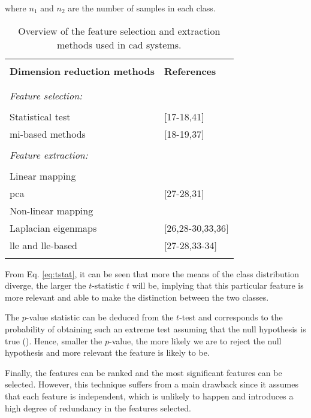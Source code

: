 \noindent where $n_1$ and $n_2$ are the number of samples in each class.

\begin{table}
	\caption{Overview of the feature selection and extraction methods used in \ac{cad} systems.}
	\small
	\begin{tabular}{p{.65\linewidth} p{.25\linewidth}}
		\hline \\ [-1.5ex]
		\textbf{Dimension reduction methods} & \textbf{References} \\ \\ [-1.5ex]
		\hline \\ [-1.5ex]
		\textit{Feature selection:} & \\ \\ [-1.5ex]
		\quad Statistical test & $[$17-18,41$]$ \\
		\quad \ac{mi}-based methods & $[$18-19,37$]$ \\ \\ [-1.5ex]
		\textit{Feature extraction:} & \\ \\ [-1.5ex]
		\quad Linear mapping & \\
		\quad \quad \acs{pca} & $[$27-28,31$]$ \\
		\quad Non-linear mapping & \\
		\quad \quad Laplacian eigenmaps & $[$26,28-30,33,36$]$ \\
		\quad \quad \acs{lle} and \acs{lle}-based & $[$27-28,33-34$]$ \\ \\ [-1.5ex]
		\hline
	\end{tabular}
	\label{tab:featext}
\end{table}

From Eq. \eqref{eq:tstat}, it can be seen that more the means of the class distribution diverge, the larger the $t$-statistic $t$ will be, implying that this particular feature is more relevant and able to make the distinction between the two classes. 

The $p$-value statistic can be deduced from the $t$-test and corresponds to the probability of obtaining such an extreme test assuming that the null hypothesis is true (\cite{Goodman1999}). Hence, smaller the $p$-value, the more likely we are to reject the null hypothesis and more relevant the feature is likely to be.

Finally, the features can be ranked and the most significant features can be selected. However, this technique suffers from a main drawback since it assumes that each feature is independent, which is unlikely to happen and introduces a high degree of redundancy in the features selected.

